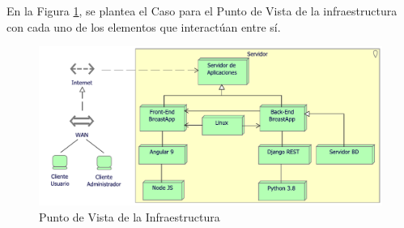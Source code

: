 En la Figura \ref{PvInfraestructura}, se plantea el Caso para el Punto de Vista de la infraestructura con cada uno de los elementos que interactúan entre sí. 

\begin{figure}[h!]
	\centering
	\includegraphics[width=1\linewidth]{ARQUITECTURA/imgs/CapaTecnologia/1_PvInfraestructuraTec}
	\caption{Punto de Vista de la Infraestructura}
	\label{PvInfraestructura}
\end{figure}

